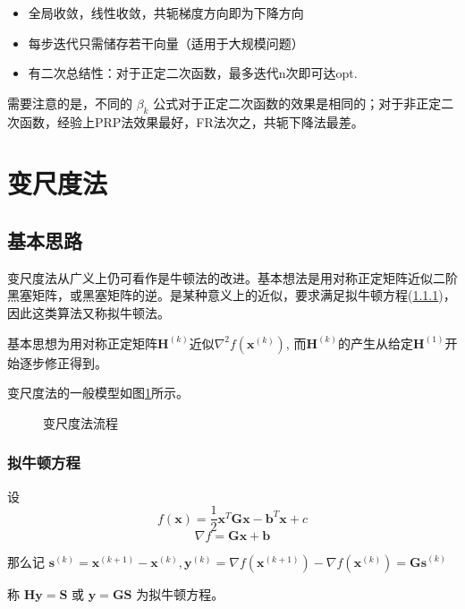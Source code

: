 \documentclass{book}
\begin{document}
\begin{itemize}
    \item 全局收敛，线性收敛，共轭梯度方向即为下降方向
    \item 每步迭代只需储存若干向量（适用于大规模问题）
    \item 有二次总结性：对于正定二次函数，最多迭代n次即可达opt.
\end{itemize}

需要注意的是，不同的 $\beta_k$ 公式对于正定二次函数的效果是相同的；对于非正定二次函数，经验上PRP法效果最好，FR法次之，共轭下降法最差。

\section{变尺度法}

\subsection{基本思路}

变尺度法从广义上仍可看作是牛顿法的改进。基本想法是用对称正定矩阵近似二阶黑塞矩阵，或黑塞矩阵的逆。是某种意义上的近似，要求满足拟牛顿方程(\ref{subsubsec:quasi-newton equation})，因此这类算法又称拟牛顿法。

基本思想为用对称正定矩阵$\boldsymbol{H}^{(k)}$近似$\nabla^2f(\boldsymbol{x}^{(k)})$, 而$\boldsymbol{H}^{(k)}$的产生从给定$\boldsymbol{H}^{(1)}$开始逐步修正得到。

变尺度法的一般模型如图\ref{fig:flow of variable metric method}所示。
\begin{figure}[ht]
    \centering
    
    \caption{变尺度法流程}
    \label{fig:flow of variable metric method}
\end{figure}

\subsubsection{拟牛顿方程}
\label{subsubsec:quasi-newton equation}

设
$$
    f(\boldsymbol{x})=\frac{1}{2}\boldsymbol{x}^T\boldsymbol{G}\boldsymbol{x}-\boldsymbol{b}^T\boldsymbol{x}+c
$$
$$\nabla f=\boldsymbol{Gx}+\boldsymbol{b}$$

那么记 $\boldsymbol{s}^{(k)}=\boldsymbol{x}^{(k+1)}-\boldsymbol{x}^{(k)}, \boldsymbol{y}^{(k)}=\nabla f(\boldsymbol{x}^{(k+1)})-\nabla f(\boldsymbol{x}^{(k)})=\boldsymbol{Gs}^{(k)}$

称 $\boldsymbol{Hy}=\boldsymbol{S}$ 或 $\boldsymbol{y}=\boldsymbol{GS}$ 为拟牛顿方程。
\end{document}
